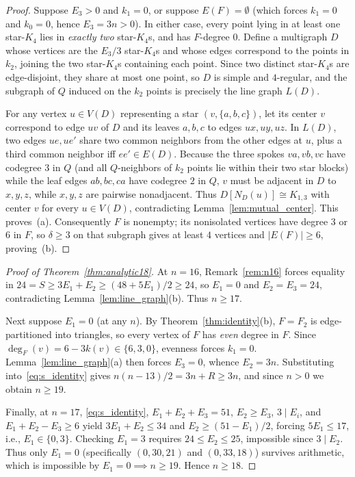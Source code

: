 \documentclass[11pt]{amsart}
\theoremstyle{definition}
\theoremstyle{remark}
\begin{document}
\begin{proof}
Suppose $E_3 > 0$ and $k_1 = 0$, or suppose $E(F) = \emptyset$ (which forces $k_1 = 0$ and $k_0 = 0$, hence $E_3 = 3n > 0$). In either case, every point lying in at least one star-$K_4$ lies in \emph{exactly two} star-$K_4$s, and has $F$-degree $0$. Define a multigraph $D$ whose vertices are the $E_3/3$ star-$K_4$s and whose edges correspond to the points in $k_2$, joining the two star-$K_4$s containing each point. Since two distinct star-$K_4$s are edge-disjoint, they share at most one point, so $D$ is simple and $4$-regular, and the subgraph of $Q$ induced on the $k_2$ points is precisely the line graph $L(D)$.

For any vertex $u \in V(D)$ representing a star $(v, \{a,b,c\})$, let its center $v$ correspond to edge $uv$ of $D$ and its leaves $a, b, c$ to edges $ux, uy, uz$. In $L(D)$, two edges $ue, ue'$ share two common neighbors from the other edges at $u$, plus a third common neighbor iff $ee' \in E(D)$. Because the three spokes $va, vb, vc$ have codegree $3$ in $Q$ (and all $Q$-neighbors of $k_2$ points lie within their two star blocks) while the leaf edges $ab, bc, ca$ have codegree $2$ in $Q$, $v$ must be adjacent in $D$ to $x, y, z$, while $x, y, z$ are pairwise nonadjacent. Thus $D[N_D(u)] \cong K_{1,3}$ with center $v$ for every $u \in V(D)$, contradicting Lemma~\ref{lem:mutual_center}. This proves~(a). Consequently $F$ is nonempty; its nonisolated vertices have degree $3$ or $6$ in $F$, so $\delta \ge 3$ on that subgraph gives at least $4$ vertices and $|E(F)| \ge 6$, proving~(b).
\end{proof}

\begin{proof}[Proof of Theorem~\ref{thm:analytic18}]
At $n = 16$, Remark~\ref{rem:n16} forces equality in $24 = S \ge 3E_1 + E_2 \ge (48 + 5E_1)/2 \ge 24$, so $E_1 = 0$ and $E_2 = E_3 = 24$, contradicting Lemma~\ref{lem:line_graph}(b). Thus $n \ge 17$.

Next suppose $E_1 = 0$ (at any $n$). By Theorem~\ref{thm:identity}(b), $F = F_2$ is edge-partitioned into triangles, so every vertex of $F$ has \emph{even} degree in $F$. Since $\deg_F(v) = 6 - 3k(v) \in \{6,3,0\}$, evenness forces $k_1 = 0$. Lemma~\ref{lem:line_graph}(a) then forces $E_3 = 0$, whence $E_2 = 3n$. Substituting into~\eqref{eq:s_identity} gives $n(n-13)/2 = 3n + R \ge 3n$, and since $n > 0$ we obtain $n \ge 19$.

Finally, at $n = 17$, \eqref{eq:s_identity}, $E_1 + E_2 + E_3 = 51$, $E_2 \ge E_3$, $3 \mid E_i$, and $E_1 + E_2 - E_3 \ge 6$ yield $3E_1 + E_2 \le 34$ and $E_2 \ge (51 - E_1)/2$, forcing $5E_1 \le 17$, i.e., $E_1 \in \{0, 3\}$. Checking $E_1 = 3$ requires $24 \le E_2 \le 25$, impossible since $3 \mid E_2$. Thus only $E_1 = 0$ (specifically $(0,30,21)$ and $(0,33,18)$) survives arithmetic, which is impossible by $E_1 = 0 \implies n \ge 19$. Hence $n \ge 18$.
\end{proof}
\end{document}

